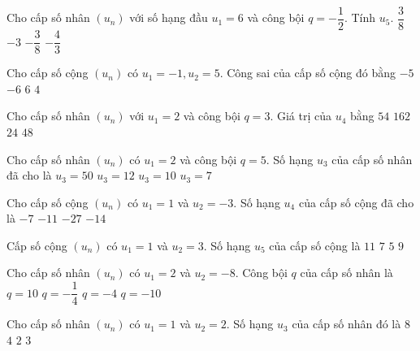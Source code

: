 \begin{ex}
Cho cấp số nhân $(u_n)$ với số hạng đầu $u_1=6$ và công bội $q=-\dfrac{1}{2}$. Tính $u_5$.
\choice
{\True $\dfrac{3}{8}$}
{$-3$}
{$-\dfrac{3}{8}$}
{$-\dfrac{4}{3}$}
\end{ex}
\begin{ex}
Cho cấp số cộng $(u_n)$ có $u_1=-1,u_2=5$. Công sai của cấp số cộng đó bằng
\choice
{$-5$}
{$-6$}
{\True $6$}
{$4$}
\end{ex}
\begin{ex}
Cho cấp số nhân $(u_n)$ với $u_1=2$ và công bội $q=3$. Giá trị của $u_4$ bằng
\choice
{\True $54$}
{$162$}
{$24$}
{$48$}
\end{ex}
\begin{ex}
Cho cấp số nhân $(u_n)$ có $u_1=2$ và công bội $q=5$. Số hạng $u_3$ của cấp số nhân đã cho là
\choice
{\True $u_3=50$}
{$u_3=12$}
{$u_3=10$}
{$u_3=7$}
\end{ex}
\begin{ex}
Cho cấp số cộng $(u_n)$ có $u_1=1$ và $u_2=-3$. Số hạng $u_4$ của cấp số cộng đã cho là
\choice
{$-7$}
{\True $-11$}
{$-27$}
{$-14$}
\end{ex}
\begin{ex}
Cấp số cộng $(u_n)$ có $u_1=1$ và $u_2=3$. Số hạng $u_5$ của cấp số cộng là
\choice
{$11$}
{$7$}
{$5$}
{\True $9$}
\end{ex}
\begin{ex}
Cho cấp số nhân $(u_n)$ có $u_1=2$ và $u_2=-8$. Công bội $q$ của cấp số nhân là
\choice
{$q=10$}
{$q=-\dfrac{1}{4}$}
{\True $q=-4$}
{$q=-10$}
\end{ex}
\begin{ex}
Cho cấp số nhân $(u_n)$ có $u_1=1$ và $u_2=2$. Số hạng $u_3$ của cấp số nhân đó là 
\choice
{$8$}
{\True $4$}
{$2$}
{$3$}
\end{ex}
